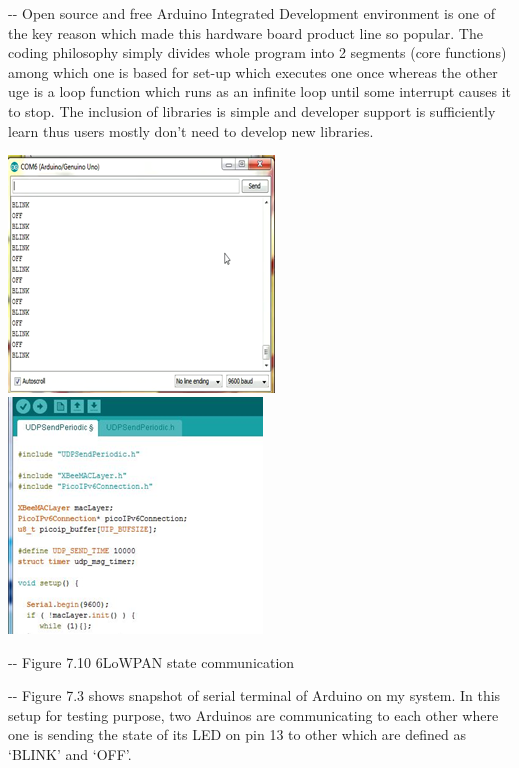 \documentclass[12pt]{article}
\makeatletter
\newenvironment{indentation}[3]%
	{\par\setlength{\parindent}{#3}
	\setlength{\leftmargin}{#1}       \setlength{\rightmargin}{#2}%
	\advance\linewidth -\leftmargin       \advance\linewidth -\rightmargin%
	\advance\@totalleftmargin\leftmargin  \@setpar{{\@@par}}%
	\parshape 1\@totalleftmargin \linewidth\ignorespaces}{\par}%
\makeatother
\begin{document}
\begin{indentation}{0pt}{0pt}{0pt}
Open source and free Arduino Integrated Development environment is one of the
key reason which made this hardware board product line so popular. The coding
philosophy simply divides whole program into 2 segments (core functions) among
which one is based for set-up which executes one once whereas the other uge is a
loop function which runs as an infinite loop until some interrupt causes it to
stop. The inclusion of libraries is simple and developer support is sufficiently
learn thus users mostly don't need to develop new libraries.
\end{indentation}
\includegraphics[width=200pt]{img-37.png}
\includegraphics[width=191pt]{img-23.png}
\begin{center}
\begin{indentation}{0pt}{0pt}{0pt}
Figure 7.10 6LoWPAN state communication
\end{indentation}
\end{center}

\begin{indentation}{0pt}{0pt}{0pt}
Figure 7.3 shows snapshot of serial terminal of Arduino on my system. In this
setup for testing purpose, two Arduinos are communicating to each other where one
is sending the state of its LED on pin 13 to other which are defined as `BLINK'
and `OFF'.
\end{indentation}
\end{document}
